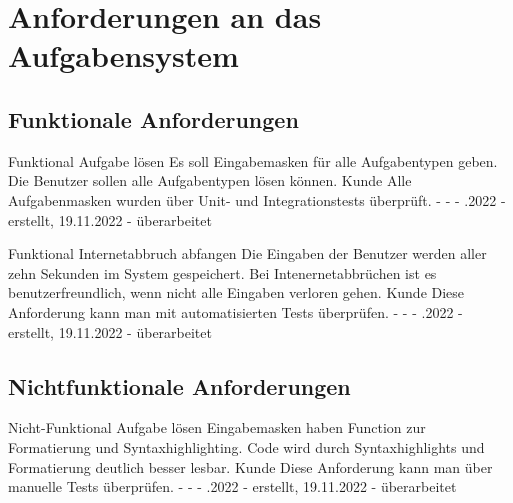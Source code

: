 \section*{Anforderungen an das Aufgabensystem}
\subsection*{Funktionale Anforderungen}
\begin{myreq}
  \threeinline
    {}
    {\reqtype Funktional}
    {\reqevent Aufgabe lösen}
  \reqdesc Es soll Eingabemasken für alle Aufgabentypen geben.
  \reqrat Die Benutzer sollen alle Aufgabentypen lösen können.
  \reqorig Kunde
  \reqfit Alle Aufgabenmasken wurden über Unit- und Integrationstests überprüft.
  \twoinline
    {}
    {}
  \twoinline
  {\reqdep -}
  {\reqconf -}
  \reqmater -
  .2022 - erstellt, 19.11.2022 - überarbeitet
\end{myreq}


\begin{myreq}
  \threeinline
    {}
    {\reqtype Funktional}
    {\reqevent Internetabbruch abfangen}
  \reqdesc Die Eingaben der Benutzer werden aller zehn Sekunden im System gespeichert.
  \reqrat Bei Intenernetabbrüchen ist es benutzerfreundlich, wenn nicht alle Eingaben verloren gehen.
  \reqorig Kunde
  \reqfit Diese Anforderung kann man mit automatisierten Tests überprüfen.
  \twoinline
    {}
    {}
  \twoinline
  {\reqdep -}
  {\reqconf -}
  \reqmater -
  .2022 - erstellt, 19.11.2022 - überarbeitet
\end{myreq}

\subsection*{Nichtfunktionale Anforderungen}

\begin{myreq}
  \twoinline
    {}
    {\reqtype Nicht-Funktional}
    {\reqevent Aufgabe lösen}
  \reqdesc Eingabemasken haben Function zur Formatierung und Syntaxhighlighting.
  \reqrat Code wird durch Syntaxhighlights und Formatierung deutlich besser lesbar.
  \reqorig Kunde
  \reqfit Diese Anforderung kann man über manuelle Tests überprüfen.
  \twoinline
    {}
    {}
  \twoinline
  {\reqdep -}
  {\reqconf -}
  \reqmater -
  .2022 - erstellt, 19.11.2022 - überarbeitet
\end{myreq}

